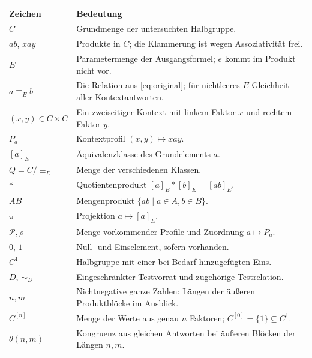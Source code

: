 \documentclass[a4paper,11pt,oneside]{report}
\begin{document}
\begingroup
\renewcommand{\arraystretch}{1.3}
\begin{tabularx}{\linewidth}{@{}lX@{}}
\toprule
Zeichen&Bedeutung\\\midrule
\(C\)&Grundmenge der untersuchten Halbgruppe.\\
\(ab\), \(xay\)&Produkte in \(C\); die Klammerung ist wegen Assoziativität frei.\\
\(E\)&Parametermenge der Ausgangsformel; \(e\) kommt im Produkt nicht vor.\\
\(a\equiv_E b\)&Die Relation aus \eqref{eq:original}; für nichtleeres \(E\) Gleichheit aller Kontextantworten.\\
\((x,y)\in C\times C\)&Ein zweiseitiger Kontext mit linkem Faktor \(x\) und rechtem Faktor \(y\).\\
\(P_a\)&Kontextprofil \((x,y)\mapsto xay\).\\
\([a]_E\)&Äquivalenzklasse des Grundelements \(a\).\\
\(Q=C/{\equiv_E}\)&Menge der verschiedenen Klassen.\\
\(\ast\)&Quotientenprodukt \([a]_E\ast[b]_E=[ab]_E\).\\
\(AB\)&Mengenprodukt \(\{ab\mid a\in A,b\in B\}\).\\
\(\pi\)&Projektion \(a\mapsto[a]_E\).\\
\(\mathcal P,\rho\)&Menge vorkommender Profile und Zuordnung \(a\mapsto P_a\).\\
\(0\), \(1\)&Null- und Einselement, sofern vorhanden.\\
\(C^1\)&Halbgruppe mit einer bei Bedarf hinzugefügten Eins.\\
\(D\), \(\sim_D\)&Eingeschränkter Testvorrat und zugehörige Testrelation.\\
\(n,m\)&Nichtnegative ganze Zahlen: Längen der äußeren Produktblöcke im Ausblick.\\
\(C^{[n]}\)&Menge der Werte aus genau \(n\) Faktoren; \(C^{[0]}=\{1\}\subseteq C^1\).\\
\(\theta(n,m)\)&Kongruenz aus gleichen Antworten bei äußeren Blöcken der Längen \(n,m\).\\
\bottomrule
\end{tabularx}
\endgroup
\end{document}
